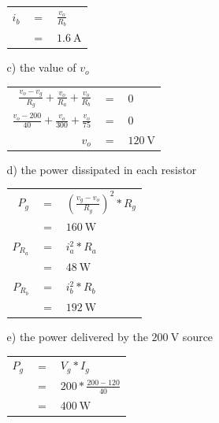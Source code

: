 \documentclass[a4paper]{article}
\begin{document}
\begin{itemize}
\begin{itemize}
	      	      \begin{tabular}{r c l}
	      	      	$i_{b}$ & $=$ & $\frac{v_{o}}{R_{b}}$ \\
	      	      	        & $=$ & $\SI{1.6}{\ampere}$   \\
	      	      \end{tabular} 
	      	\item[c)] the value of $v_{o}$ \\
	      	      \begin{tabular}{r c l}
	      	      	$\frac{v_{o} - v_{g}}{R_{g}} + \frac{v_{o}}{R_{a}} + \frac{v_{o}}{R_{b}}$ & $=$ & $0$               \\
	      	      	$\frac{v_{o} - 200}{40} + \frac{v_{o}}{300} + \frac{v_{o}}{75}$           & $=$ & $0$               \\
	      	      	$v_{o}$                                                                   & $=$ & $\SI{120}{\volt}$ \\
	      	      \end{tabular}   
	      	\item[d)] the power dissipated in each resistor \\
	      	      \begin{tabular}{r c l}
	      	      	$P_{g}$     & $=$ & $(\frac{v_{g} - v_{o}}{R_{g}})^2 * R_{g}$ \\
	      	      	            & $=$ & $\SI{160}{\watt}$                         \\
	      	      	$P_{R_{a}}$ & $=$ & $i_{a}^2 * R_{a}$                         \\
	      	      	            & $=$ & $\SI{48}{\watt}$                          \\
	      	      	$P_{R_{b}}$ & $=$ & $i_{b}^2 * R_{b}$                         \\
	      	      	            & $=$ & $\SI{192}{\watt}$                         \\
	      	      \end{tabular} 
	      	\item[e)] the power delivered by the $\SI{200}{\volt}$ source \\
	      	      \begin{tabular}{r c l}
	      	      	$P_{g}$ & $=$ & $V_{g} * I_{g}$              \\
	      	      	        & $=$ & $200 * \frac{200 - 120}{40}$ \\
	      	      	        & $=$ & $\SI{400}{\watt}$            \\

\end{tabular}
\end{itemize}
\end{itemize}
\end{document}
